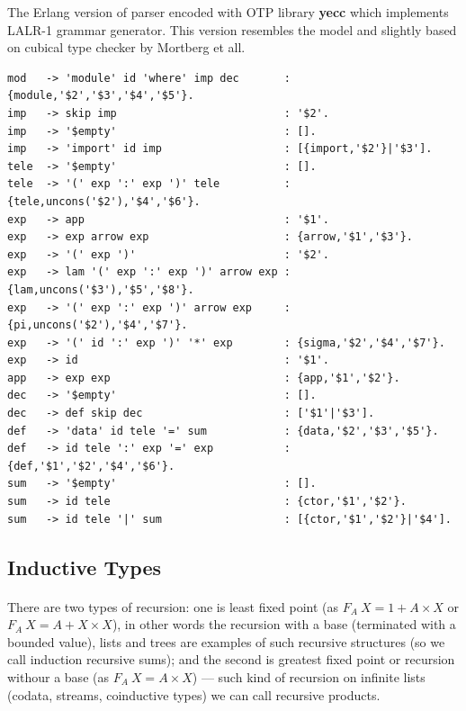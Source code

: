 \documentclass[11pt,oneside]{article}
\begin{document}
The Erlang version of parser encoded with OTP library {\bf yecc} which implements
LALR-1 grammar generator. This version resembles the model and slightly based on cubical
type checker by Mortberg et all.

\begin{lstlisting}
mod   -> 'module' id 'where' imp dec       : {module,'$2','$3','$4','$5'}.
imp   -> skip imp                          : '$2'.
imp   -> '$empty'                          : [].
imp   -> 'import' id imp                   : [{import,'$2'}|'$3'].
tele  -> '$empty'                          : [].
tele  -> '(' exp ':' exp ')' tele          : {tele,uncons('$2'),'$4','$6'}.
exp   -> app                               : '$1'.
exp   -> exp arrow exp                     : {arrow,'$1','$3'}.
exp   -> '(' exp ')'                       : '$2'.
exp   -> lam '(' exp ':' exp ')' arrow exp : {lam,uncons('$3'),'$5','$8'}.
exp   -> '(' exp ':' exp ')' arrow exp     : {pi,uncons('$2'),'$4','$7'}.
exp   -> '(' id ':' exp ')' '*' exp        : {sigma,'$2','$4','$7'}.
exp   -> id                                : '$1'.
app   -> exp exp                           : {app,'$1','$2'}.
dec   -> '$empty'                          : [].
dec   -> def skip dec                      : ['$1'|'$3'].
def   -> 'data' id tele '=' sum            : {data,'$2','$3','$5'}.
def   -> id tele ':' exp '=' exp           : {def,'$1','$2','$4','$6'}.
sum   -> '$empty'                          : [].
sum   -> id tele                           : {ctor,'$1','$2'}.
sum   -> id tele '|' sum                   : [{ctor,'$1','$2'}|'$4'].
\end{lstlisting}

\newpage
\subsection{Inductive Types}

\paragraph{}
There are two types of recursion: one is least fixed point (as $F_A\ X = 1 + A\times X$
or $F_A\ X = A + X\times X$), in other words the recursion with a base (terminated with a bounded value),
lists and trees are examples of such recursive structures (so we call induction recursive sums);
and the second is greatest fixed point or recursion withour a base (as $F_A\ X = A\times X $) ---
such kind of recursion on infinite lists (codata, streams, coinductive types) we can call recursive products.\\
\end{document}
